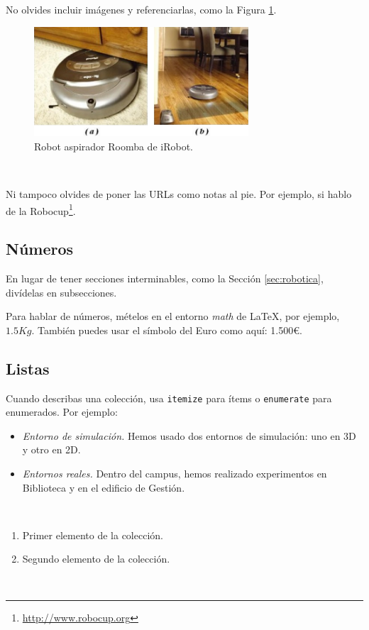 No olvides incluir imágenes y referenciarlas, como la Figura \ref{fig:roomba}.

\begin{figure} [h!]
	\begin{center}
		\includegraphics[width=8cm]{figs/roomba}
	\end{center}
	\caption{Robot aspirador Roomba de iRobot.}
	\label{fig:roomba}
\end{figure}\

Ni tampoco olvides de poner las URLs como notas al pie. Por ejemplo, si hablo de la Robocup\footnote{\url{http://www.robocup.org}}.

\subsection{Números}
\label{sec:subseccion}

En lugar de tener secciones interminables, como la Sección \ref{sec:robotica}, divídelas en subsecciones.

Para hablar de números, mételos en el entorno \textit{math} de \LaTeX, por ejemplo, $1.5Kg$. También puedes usar el símbolo del Euro como aquí: 1.500\euro.

\subsection{Listas}

Cuando describas una colección, usa \texttt{itemize} para ítems o \texttt{enumerate} para enumerados. Por ejemplo:

\begin{itemize}
	\item \textit{Entorno de simulación.} Hemos usado dos entornos de simulación: uno en 3D y otro en 2D.
	\item \textit{Entornos reales.} Dentro del campus, hemos realizado experimentos en Biblioteca y en el edificio de Gestión.
\end{itemize}\

\begin{enumerate}
	\item Primer elemento de la colección.
	\item Segundo elemento de la colección.
\end{enumerate}\

